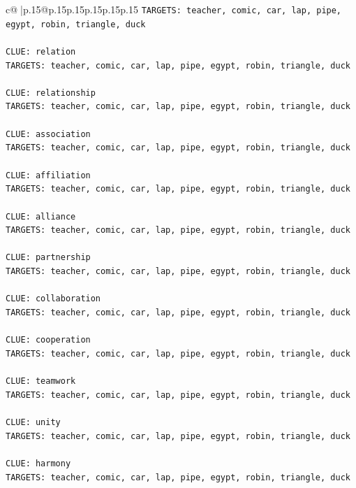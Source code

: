 \documentclass{article}
\begin{document}
{\begin{supertabular}{c@{$\;$}|p{.15\linewidth}@{}p{.15\linewidth}p{.15\linewidth}p{.15\linewidth}p{.15\linewidth}p{.15\linewidth}}
{{{\texttt{TARGETS: teacher, comic, car, lap, pipe, egypt, robin, triangle, duck} \\
\\ 
\texttt{CLUE: relation} \\
\texttt{TARGETS: teacher, comic, car, lap, pipe, egypt, robin, triangle, duck} \\
\\ 
\texttt{CLUE: relationship} \\
\texttt{TARGETS: teacher, comic, car, lap, pipe, egypt, robin, triangle, duck} \\
\\ 
\texttt{CLUE: association} \\
\texttt{TARGETS: teacher, comic, car, lap, pipe, egypt, robin, triangle, duck} \\
\\ 
\texttt{CLUE: affiliation} \\
\texttt{TARGETS: teacher, comic, car, lap, pipe, egypt, robin, triangle, duck} \\
\\ 
\texttt{CLUE: alliance} \\
\texttt{TARGETS: teacher, comic, car, lap, pipe, egypt, robin, triangle, duck} \\
\\ 
\texttt{CLUE: partnership} \\
\texttt{TARGETS: teacher, comic, car, lap, pipe, egypt, robin, triangle, duck} \\
\\ 
\texttt{CLUE: collaboration} \\
\texttt{TARGETS: teacher, comic, car, lap, pipe, egypt, robin, triangle, duck} \\
\\ 
\texttt{CLUE: cooperation} \\
\texttt{TARGETS: teacher, comic, car, lap, pipe, egypt, robin, triangle, duck} \\
\\ 
\texttt{CLUE: teamwork} \\
\texttt{TARGETS: teacher, comic, car, lap, pipe, egypt, robin, triangle, duck} \\
\\ 
\texttt{CLUE: unity} \\
\texttt{TARGETS: teacher, comic, car, lap, pipe, egypt, robin, triangle, duck} \\
\\ 
\texttt{CLUE: harmony} \\
\texttt{TARGETS: teacher, comic, car, lap, pipe, egypt, robin, triangle, duck} \\
}}}
\end{supertabular}}
\end{document}
